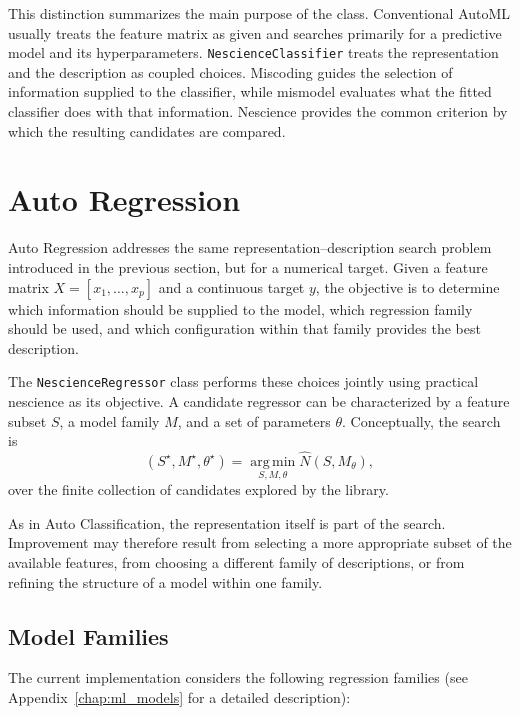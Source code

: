 This distinction summarizes the main purpose of the class. Conventional AutoML usually treats the feature matrix as given and searches primarily for a predictive model and its hyperparameters. \texttt{NescienceClassifier} treats the representation and the description as coupled choices. Miscoding guides the selection of information supplied to the classifier, while mismodel evaluates what the fitted classifier does with that information. Nescience provides the common criterion by which the resulting candidates are compared.

%
%

\section{Auto Regression}
\label{sec:machine_learning_regression}

Auto Regression addresses the same representation--description search problem introduced in the previous section, but for a numerical target. Given a feature matrix $X=[x_1,\ldots,x_p]$ and a continuous target $y$, the objective is to determine which information should be supplied to the model, which regression family should be used, and which configuration within that family provides the best description.

The \texttt{NescienceRegressor} class performs these choices jointly using practical nescience as its objective. A candidate regressor can be characterized by a feature subset $S$, a model family $M$, and a set of parameters $\theta$. Conceptually, the search is
\[
(S^\star,M^\star,\theta^\star) = \operatorname*{arg\,min}_{S,M,\theta} \widehat N(S,M_\theta),
\]
over the finite collection of candidates explored by the library.

As in Auto Classification, the representation itself is part of the search. Improvement may therefore result from selecting a more appropriate subset of the available features, from choosing a different family of descriptions, or from refining the structure of a model within one family.


\subsection*{Model Families}

The current implementation considers the following regression families (see Appendix~\ref{chap:ml_models} for a detailed description):

